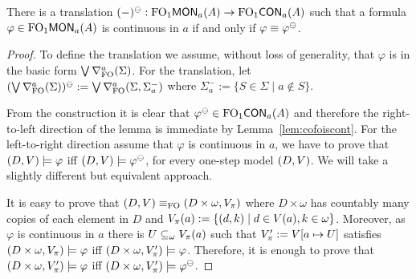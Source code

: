 \begin{lemma}
There is a translation $(-)^\tcont:\monot{\ofo}{a}(A) \to \cont{\ofo}{a}(A)$ such that
a formula ${\varphi \in \monot{\ofo}{a}(A)}$ is continuous in $a$ if and only if $\varphi\equiv \varphi^\tcont$.
\end{lemma}
\begin{proof}
To define the translation we assume, without loss of generality, that $\varphi$ is in the basic form $\bigvee \mondbnfofo{\Sigma}{a}$.
%
For the translation, let
$(\bigvee \mondbnfofo{\Sigma}{a})^\tcont := \bigvee \mondgbnfofo{\Sigma}{\Sigma^{-}_{a}}{a}$
where
%
%
$\Sigma^{-}_{a} := \{S\in \Sigma \mid a\notin S\}$.

\bigskip
From the construction it is clear that $\varphi^\tcont \in \cont{\ofo}{a}(A)$ and therefore the right-to-left direction of the lemma is immediate by Lemma~\ref{lem:cofoiscont}. For the left-to-right direction assume that $\varphi$ is continuous in $a$, we have to prove that $(D,\val) \models \varphi$ iff $(D,\val) \models \varphi^\tcont$, for every one-step model $(D,\val)$. We will take a slightly different but equivalent approach.

It is easy to prove that $(D,\val) \equiv_\fo (D\times \omega,\val_\pi)$ where $D\times\omega$ has countably many copies of each element in $D$ and $\val_\pi(a) := \{(d,k) \mid d\in \val(a), k\in\omega\}$.
%
Moreover, as $\varphi$ is continuous in $a$ there is $U \subseteq_\omega \val_\pi(a)$ such that $\val'_\pi := \val[a \mapsto U]$ satisfies $(D\times\omega,\val_\pi) \models \varphi$ iff $(D\times\omega,\val'_\pi) \models \varphi$.
%
Therefore, it is enough to prove that $(D\times\omega,\val'_\pi) \models \varphi$ iff $(D\times\omega,\val'_\pi) \models \varphi^\tcont$. %


\end{proof}
